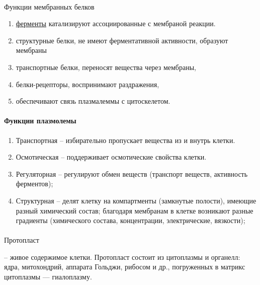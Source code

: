 \paragraph*{}Функции мембранных белков

\begin{enumerate}

	\item \hyperlink{enzimes}{ферменты} катализируют ассоциированные с мембраной реакции. 
	\item структурные белки, не имеют ферментативной активности, образуют мембраны
	\item транспортные белки, переносят вещества через мембраны,
	\item белки-рецепторы, воспринимают раздражения,
	\item обеспечивают связь плазмалеммы с цитоскелетом.

\end{enumerate}

\paragraph{Функции плазмолемы}

\begin{enumerate}
	\item Транспортная -- избирательно пропускает вещества из и внутрь клетки.
	\item Осмотическая -- поддерживает осмотические свойства клетки.
	\item Регуляторная -- регулируют обмен веществ (транспорт веществ, активность ферментов);
	\item Структурная -- делят клетку на компартменты (замкнутые полости), имеющие разный химический состав; благодаря мембранам в клетке возникают разные градиенты (химического состава, концентрации, электрические, вязкости);
\end{enumerate}


\paragraph*{}\hypertarget{protoplast}{Протопласт} -- живое содержимое клетки. Протопласт состоит из \hypertarget{citoplasma}{цитоплазмы} и органелл: ядра, митохондрий, аппарата Гольджи, рибосом и др., погруженных в матрикс цитоплазмы — гиалоплазму.

